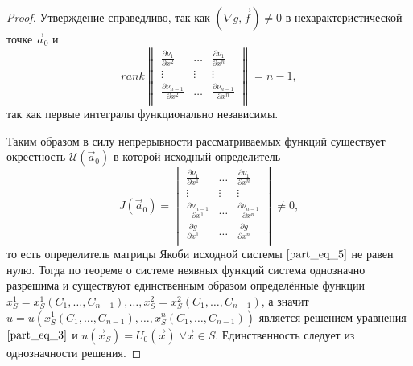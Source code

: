 \begin{proof}
    Утверждение справедливо, так как $ \left( \nabla g, \vec{f} \right) \neq 0$ в нехарактеристической точке $\vec{a}_0$ и
    \begin{equation*}
        rank
        \begin{Vmatrix}
            \frac{\partial \nu_1}{\partial x^2} & \dots & \frac{\partial \nu_1}{\partial x^n}             \\
            \vdots & \vdots & \vdots                                                                                        \\
            \frac{\partial \nu_{n - 1}}{\partial x^2} & \dots & \frac{\partial \nu_{n - 1}}{\partial x^n} \\
        \end{Vmatrix} = n - 1,
    \end{equation*}
    так как первые интегралы функционально независимы.
    
    Таким образом в силу непрерывности рассматриваемых функций существует окрестность $\mathcal{U} \left( \vec{a}_0 \right)$ в которой исходный определитель
    \begin{equation*}
        J \left( \vec{a}_0 \right) =
        \begin{vmatrix}
            \frac{\partial \nu_1}{\partial x^1} & \dots & \frac{\partial \nu_1}{\partial x^n}             \\
            \vdots & \vdots & \vdots                                                                                         \\
            \frac{\partial \nu_{n - 1}}{\partial x^1} & \dots & \frac{\partial \nu_{n - 1}}{\partial x^n} \\
            \frac{\partial g}{\partial x^1} & \dots & \frac{\partial g}{\partial x^n}                     \\
        \end{vmatrix} \neq 0,
    \end{equation*}
    то есть определитель матрицы Якоби исходной системы $\eqref{part_eq_5}$ не равен нулю. Тогда по теореме о системе неявных функций система однозначно разрешима и существуют единственным образом определённые функции $x^1_S = x^1_S \left( C_1, \dots, C_{n - 1} \right), \dots, x^2_S = x^2_S \left( C_1, \dots, C_{n - 1} \right)$, а значит $u = u \left( x^1_S \left( C_1, \dots, C_{n - 1} \right), \dots, x^n_S \left( C_1, \dots, C_{n - 1} \right) \right)$ является решением уравнения $\eqref{part_eq_3}$ и $u \left( \vec{x}_S \right) = U_0 \left( \vec{x} \right) \; \forall \vec{x} \in S$. Единственность следует из однозначности решения.
    
\end{proof}

